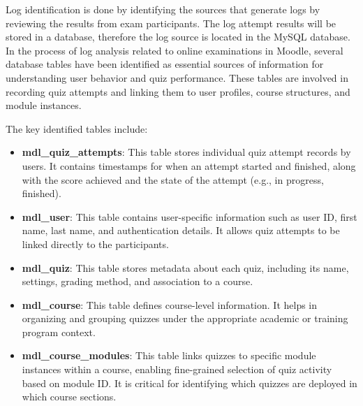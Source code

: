 Log identification is done by identifying the sources that generate logs by reviewing the results from exam participants. The log attempt results will be stored in a database, therefore the log source is located in the MySQL database.
In the process of log analysis related to online examinations in Moodle, several database tables have been identified as essential sources of information for understanding user behavior and quiz performance. These tables are involved in recording quiz attempts and linking them to user profiles, course structures, and module instances.

The key identified tables include:

\begin{itemize}
	\item \textbf{mdl\_quiz\_attempts}: This table stores individual quiz attempt records by users. It contains timestamps for when an attempt started and finished, along with the score achieved and the state of the attempt (e.g., in progress, finished).
	
	\item \textbf{mdl\_user}: This table contains user-specific information such as user ID, first name, last name, and authentication details. It allows quiz attempts to be linked directly to the participants.
	
	\item \textbf{mdl\_quiz}: This table stores metadata about each quiz, including its name, settings, grading method, and association to a course.
	
	\item \textbf{mdl\_course}: This table defines course-level information. It helps in organizing and grouping quizzes under the appropriate academic or training program context.
	
	\item \textbf{mdl\_course\_modules}: This table links quizzes to specific module instances within a course, enabling fine-grained selection of quiz activity based on module ID. It is critical for identifying which quizzes are deployed in which course sections.
\end{itemize}

